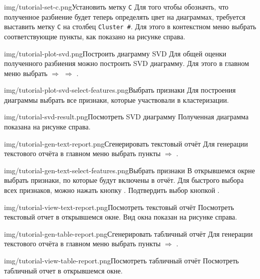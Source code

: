 \documentclass[12pt,tikz]{instruction}
\begin{document}
\begin{steps}
	\begin{ist}{img/tutorial-set-c.png}{Установить метку \texttt{C}}
		Для того чтобы обозначть, что полученное разбиение будет теперь определять цвет на диаграммах, требуется выставить метку \texttt{C} на столбец \texttt{Cluster \#}. Для этого в контекстном меню выбрать соответствующие пункты, как показано на рисунке справа.
	\end{ist}
	\begin{ist}{img/tutorial-plot-svd.png}{Построить диаграмму SVD}
		Для общей оценки полученного разбиения можно построить SVD диаграмму. Для этого в главном меню выбрать  $ \Rightarrow $  $ \Rightarrow $ .
	\end{ist}
	\begin{ist}{img/tutorial-plot-svd-select-features.png}{Выбрать признаки}
		Для построения диаграммы выбрать все признаки, которые участвовали в кластеризации.
	\end{ist}
	\begin{ist}{img/tutorial-svd-result.png}{Посмотреть SVD диаграмму}
		Полученная диаграмма показана на рисунке справа. \vspace{7cm}
	\end{ist}
	\begin{ist}{img/tutorial-gen-text-report.png}{Сгенерировать текстовый отчёт}
		Для генерации текстового отчёта в главном меню выбрать пункты  $ \Rightarrow $ .
	\end{ist}
	\begin{ist}{img/tutorial-gen-text-select-features.png}{Выбрать признаки}
		В открывшемся окрне выбрать признаки, по которые будут включены в отчёт. Для быстрого выбора всех признаков, можно нажать кнопку . Подтвердить выбор кнопкой .
	\end{ist}
	\begin{ist}{img/tutorial-view-text-report.png}{Посмотреть текстовый отчёт}
		Посмотреть текстовый отчет в открывшемся окне. Вид окна показан на рисунке справа.
	\end{ist}
	\begin{ist}{img/tutorial-gen-table-report.png}{Сгенерировать табличный отчёт}
		Для генерации текстового отчёта в главном меню выбрать пункты  $ \Rightarrow $ .
	\end{ist}
	
	\begin{ist}{img/tutorial-view-table-report.png}{Посмотреть табличный отчёт}
		Посмотреть табличный отчет в открывшемся окне.
	\end{ist}

\end{steps}
\end{document}

